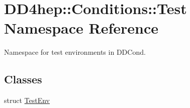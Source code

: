 \hypertarget{namespace_d_d4hep_1_1_conditions_1_1_test}{
\section{DD4hep::Conditions::Test Namespace Reference}
\label{namespace_d_d4hep_1_1_conditions_1_1_test}
}


Namespace for test environments in DDCond.  
\subsection*{Classes}
\begin{DoxyCompactItemize}
\item 
struct \hyperlink{struct_d_d4hep_1_1_conditions_1_1_test_1_1_test_env}{TestEnv}
\end{DoxyCompactItemize}
